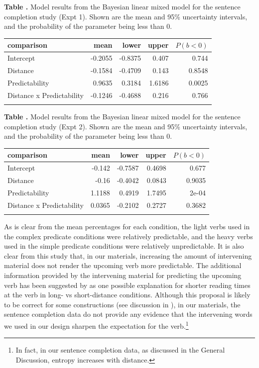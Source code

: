 \documentclass{frontiersSCNS}\usepackage{knitr} %
\begin{document}
\begin{table}[!htbp]
\textbf{\label{tab:sentcompe1} Table . }{Model results from the Bayesian linear mixed model for the sentence completion study (Expt 1). Shown are the mean and 95\% uncertainty intervals, and the probability of the parameter being less than 0.}
\processtable{}
{\begin{tabular}{lrrrr}\toprule
comparison & mean & lower & upper & $P(b<0)$ \\
\midrule   
Intercept  & -0.2055 & -0.8375 & 0.407 & 0.744\\
Distance  & -0.1584 & -0.4709 & 0.143 & 0.8548\\
Predictability  & 0.9635 & 0.3184 & 1.6186 & 0.0025\\
Distance x Predictability  & -0.1246 & -0.4688 & 0.216 & 0.766\\
\botrule
\end{tabular}}{}
\end{table}


\begin{table}[!htbp]
\textbf{\label{tab:sentcompe2} Table . }{Model results from the Bayesian linear mixed model for the sentence completion study (Expt 2). Shown are the mean and 95\% uncertainty intervals, and the probability of the parameter being less than 0.}
\processtable{}
{\begin{tabular}{lrrrr}\toprule
comparison & mean & lower & upper & $P(b<0)$ \\
\midrule   
Intercept  & -0.142 & -0.7587 & 0.4698 & 0.677\\
Distance  & -0.16 & -0.4042 & 0.0843 & 0.9035\\
Predictability  & 1.1188 & 0.4919 & 1.7495 & 2e-04\\
Distance x Predictability  & 0.0365 & -0.2102 & 0.2727 & 0.3682\\
\botrule
\end{tabular}}{}
\end{table}


As is clear from the mean percentages for each condition, the light verbs used in the complex predicate conditions were relatively predictable, and the heavy verbs used in the simple predicate conditions were relatively unpredictable.  It is also clear from this study that, in our materials, increasing the amount of intervening material does not render the upcoming verb more predictable. The additional information provided by the intervening material for predicting the upcoming verb has been suggested by  \citet{konieczny2000locality} as one possible explanation for shorter reading times at the verb in long- vs short-distance conditions. Although this proposal is likely to be correct for some constructions (see discussion in \citealt{grodner2005consequences}),  in our materials, the sentence completion data do not provide any evidence that the intervening words we used in our design sharpen the expectation for the verb.\footnote{In fact, in our sentence completion data, as discussed in the General Discussion, entropy increases with distance.}
\end{document}
